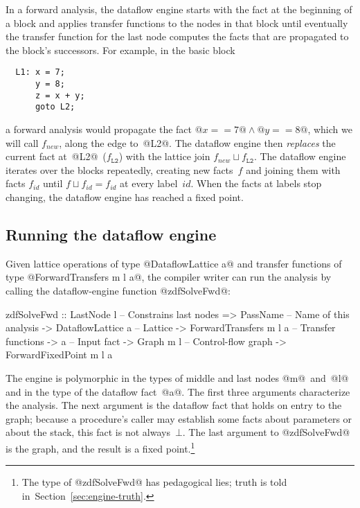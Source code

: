 \documentclass[blockstyle,preprint,nocopyrightspace]{sigplanconf}
\newcommand\join{\sqcup}
\newcommand{\authornote}[1]{{\em #1}}
\def\authornote#1{\unskip\relax}
\newcommand{\norman}[1]{\authornote{NR: #1}}
\let\remark\norman
\newcommand\secref[1]{Section~\ref{sec:#1}}
\newcommand\seclabel[1]{\label{sec:#1}}
\begin{document}
In a forward analysis, the dataflow engine starts with the fact at the
beginning of a block and applies transfer functions to the nodes in
that block until eventually the transfer function for the last node
computes the facts that are propagated to the block's successors.
For example, in the basic block
\begin{verbatim}
  L1: x = 7;
      y = 8;
      z = x + y;
      goto L2;
\end{verbatim}
a forward analysis would propagate the fact 
$@x == 7@ \land @y == 8@$, which we will call $f_{\mathit{new}}$,
along the edge to~@L2@. 
The dataflow engine then \emph{replaces} the current fact
at~@L2@~($f_{\mathtt{L2}}$) with the lattice join $f_{\mathit{new}}
\join f_{\mathtt{L2}}$. 
The dataflow engine iterates over the blocks repeatedly, creating new
facts~$f$ and joining them with facts $f_{\mathit{id}}$ until
\mbox{$f \join f_{\mathit{id}} = f_{\mathit{id}}$} at every label~$\mathit{id}$.
When the facts at labels stop changing, the dataflow
engine has reached a fixed point.



\subsection{Running the dataflow engine}

\seclabel{zdfSolveFwd}

Given lattice operations of type @DataflowLattice a@
and transfer functions of type @ForwardTransfers m l a@,
the compiler writer can run the analysis by calling the
dataflow-engine function @zdfSolveFwd@:
\begin{code}
 zdfSolveFwd 
  :: LastNode l             -- Constrains last nodes
  => PassName               -- Name of this analysis
  -> DataflowLattice a      -- Lattice
  -> ForwardTransfers m l a -- Transfer functions
  -> a                      -- Input fact
  -> Graph m l              -- Control-flow graph
  -> ForwardFixedPoint m l a
\end{code}
The engine is polymorphic in the types of middle and last nodes
@m@~and~@l@ and in the type of the dataflow fact~@a@.
The first three arguments characterize the analysis.
The next argument is the dataflow fact that holds on entry to the
graph;
because a procedure's caller may establish some facts about
parameters or about the stack,
this fact
is not always~$\bot$.
The last argument to @zdfSolveFwd@ is the graph, and the result is a 
fixed point.\footnote
{The type of @zdfSolveFwd@ has pedagogical lies;
truth is told in~\secref{engine-truth}.}
\end{document}
